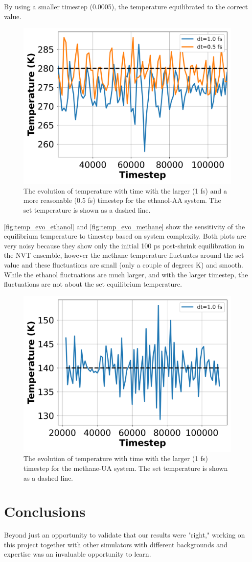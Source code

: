 By using a smaller timestep (0.0005), the temperature equilibrated to the correct value.
\begin{figure}[h!]
    \centering
    \includegraphics[width=0.8\linewidth,keepaspectratio]{figures/rep_study/temp_evolution.png}
    \caption{The evolution of temperature with time with the larger (1 fs) and a more reasonable (0.5 fs) timestep for the ethanol-AA system. The set temperature is shown as a dashed line. }\label{fig:temp_evo_ethanol}
\end{figure}
\autoref{fig:temp_evo_ethanol} and \autoref{fig:temp_evo_methane} show the sensitivity of the equilibrium temperature to timestep based on system complexity. Both plots are very noisy because they show only the initial 100 ps post-shrink equilibration in the NVT ensemble, however the methane temperature fluctuates around the set value and these fluctuations are small (only a couple of degrees K) and smooth. While the ethanol fluctuations are much larger, and with the larger timestep, the fluctuations are not about the set equilibrium temperature.
\begin{figure}[h!]
    \centering
    \includegraphics[width=0.8\linewidth,keepaspectratio]{figures/rep_study/temp_evolution_methane.png}
    \caption{The evolution of temperature with time with the larger (1 fs) timestep for the methane-UA system. The set temperature is shown as a dashed line.}\label{fig:temp_evo_methane}
\end{figure}

\section{Conclusions}
Beyond just an opportunity to validate that our results were "right," working on this project together with other simulators with different backgrounds and expertise was an invaluable opportunity to learn.

